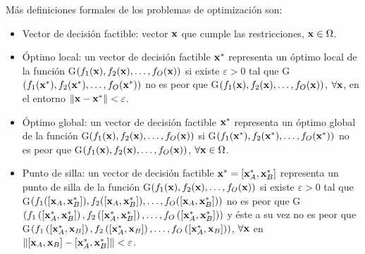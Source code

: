 Más definiciones formales de los problemas de optimización son:
\begin{itemize}
    \item Vector de decisión factible: vector $\textbf{x}$ que cumple las restricciones, $\textbf{x} \in \Omega$.
    \item Óptimo local: un vector de decisión factible $\textbf{x}^*$ representa un óptimo local de la función G$\left(f_1(\textbf{x}), f_2(\textbf{x}), \dots, f_O(\textbf{x})\right)$ si existe $\varepsilon>0$ tal que G$\left(f_1(\textbf{x}^*), f_2(\textbf{x}^*), \dots, f_O(\textbf{x}^*)\right)$ no es peor que G$\left(f_1(\textbf{x}), f_2(\textbf{x}), \dots, f_O(\textbf{x})\right)$, $\forall \textbf{x}$, en el entorno $\left\lVert \textbf{x}-\textbf{x}^* \right\rVert<\varepsilon$.
    \item Óptimo global: un vector de decisión factible $\textbf{x}^*$ representa un óptimo global de la función G$\left(f_1(\textbf{x}), f_2(\textbf{x}), \dots, f_O(\textbf{x})\right)$ si G$\left(f_1(\textbf{x}^*), f_2(\textbf{x}^*), \dots, f_O(\textbf{x}^*)\right)$ no es peor que G$\left(f_1(\textbf{x}), f_2(\textbf{x}), \dots, f_O(\textbf{x})\right)$, $\forall \textbf{x} \in \Omega$.
    \item Punto de silla: un vector de decisión factible $\textbf{x}^* = \left[\textbf{x}^*_A, \textbf{x}^*_B\right]$ representa un punto de silla de la función G$\left(f_1(\textbf{x}), f_2(\textbf{x}), \dots, f_O(\textbf{x})\right)$ si existe $\varepsilon>0$ tal que G$\left(f_1(\left[\textbf{x}_A, \textbf{x}^*_B\right]), f_2(\left[\textbf{x}_A, \textbf{x}^*_B\right]), \dots, f_O(\left[\textbf{x}_A, \textbf{x}^*_B\right])\right)$ no es peor que G$\left(f_1\left(\left[\textbf{x}^*_A, \textbf{x}^*_B\right]\right), f_2\left(\left[\textbf{x}^*_A, \textbf{x}^*_B\right]\right), \dots, f_O\left(\left[\textbf{x}^*_A, \textbf{x}^*_B\right]\right)\right)$ y éste a su vez no es peor que G$\left(f_1\left(\left[\textbf{x}^*_A, \textbf{x}_B\right]\right), f_2\left(\left[\textbf{x}^*_A, \textbf{x}_B\right]\right), \dots, f_O\left(\left[\textbf{x}^*_A, \textbf{x}_B\right]\right)\right)$, $\forall\textbf{x}$ en $\left\lVert \left[\textbf{x}_A, \textbf{x}_B\right]-\left[\textbf{x}^*_A, \textbf{x}^*_B\right] \right\rVert<\varepsilon$.
\end{itemize}

